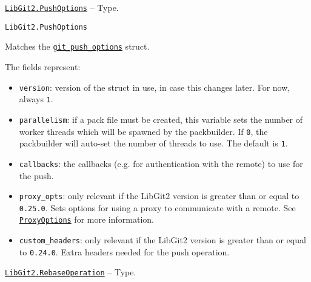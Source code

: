 \hypertarget{13899785564428555533}{}
\hyperlink{13899785564428555533}{\texttt{LibGit2.PushOptions}}  -- {Type.}

\begin{adjustwidth}{2em}{0pt}


\begin{verbatim}
LibGit2.PushOptions
\end{verbatim}

Matches the \href{https://libgit2.org/libgit2/\#HEAD/type/git\_push\_options}{\texttt{git\_push\_options}} struct.

The fields represent:

\begin{itemize}
\item \texttt{version}: version of the struct in use, in case this changes later. For now, always \texttt{1}.


\item \texttt{parallelism}: if a pack file must be created, this variable sets the number of worker  threads which will be spawned by the packbuilder. If \texttt{0}, the packbuilder will auto-set  the number of threads to use. The default is \texttt{1}.


\item \texttt{callbacks}: the callbacks (e.g. for authentication with the remote) to use for the push.


\item \texttt{proxy\_opts}: only relevant if the LibGit2 version is greater than or equal to \texttt{0.25.0}.  Sets options for using a proxy to communicate with a remote. See \hyperlink{1179613637206861638}{\texttt{ProxyOptions}}  for more information.


\item \texttt{custom\_headers}: only relevant if the LibGit2 version is greater than or equal to \texttt{0.24.0}.  Extra headers needed for the push operation.

\end{itemize}


\end{adjustwidth}
\hypertarget{4600807719307889860}{}
\hyperlink{4600807719307889860}{\texttt{LibGit2.RebaseOperation}}  -- {Type.}


